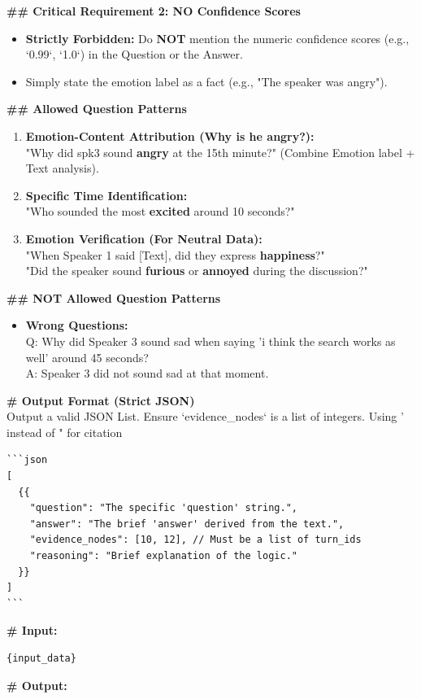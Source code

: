 \documentclass[11pt]{article}
\begin{document}
\begin{promptbox}
\vspace{0.5em}
\textbf{\#\# Critical Requirement 2: NO Confidence Scores}
\begin{itemize}[leftmargin=1.5em, nosep]
    \item \textbf{Strictly Forbidden:} Do \textbf{NOT} mention the numeric confidence scores (e.g., `0.99`, `1.0`) in the Question or the Answer.
    \item Simply state the emotion label as a fact (e.g., "The speaker was angry").
\end{itemize}

\vspace{0.5em}
\textbf{\#\# Allowed Question Patterns}
\begin{enumerate}[leftmargin=2em, nosep]
    \item \textbf{Emotion-Content Attribution (Why is he angry?):}\\
    "Why did spk3 sound \textbf{angry} at the 15th minute?" (Combine Emotion label + Text analysis).
    \item \textbf{Specific Time Identification:}\\
    "Who sounded the most \textbf{excited} around 10 seconds?"
    \item \textbf{Emotion Verification (For Neutral Data):}\\
    "When Speaker 1 said [Text], did they express \textbf{happiness}?"\\
    "Did the speaker sound \textbf{furious} or \textbf{annoyed} during the discussion?"
\end{enumerate}

\vspace{0.5em}
\textbf{\#\# NOT Allowed Question Patterns}
\begin{itemize}[leftmargin=1.5em, nosep]
    \item \textbf{Wrong Questions:}\\
    Q: Why did Speaker 3 sound sad when saying 'i think the search works as well' around 45 seconds?\\
    A: Speaker 3 did not sound sad at that moment.
\end{itemize}

\vspace{0.5em}
\textbf{\# Output Format (Strict JSON)}\\
Output a valid JSON List. Ensure `evidence\_nodes` is a list of integers. Using ' instead of " for citation

\begin{verbatim}
```json
[
  {{
    "question": "The specific 'question' string.",
    "answer": "The brief 'answer' derived from the text.",
    "evidence_nodes": [10, 12], // Must be a list of turn_ids
    "reasoning": "Brief explanation of the logic."
  }}
]
```
\end{verbatim}
\vspace{0.5em}
\textbf{\# Input:}
\begin{verbatim}
{input_data}
\end{verbatim}

\textbf{\# Output:}
\end{promptbox}
\end{document}

